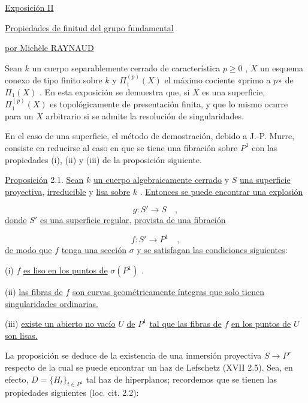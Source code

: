 


\underline{Exposición II}


\underline{\underline{Propiedades de finitud del grupo fundamental}}


\underline{por Michèle RAYNAUD}

Sean  $k$  un cuerpo separablemente cerrado de característica  $p \geqslant 0$ , $X$  un esquema conexo de tipo finito sobre  $k$  y  $\Pi_1^{(p)}(X)$  el máximo cociente «primo a $p$» de  $\Pi_1(X)$ . En esta exposición se demuestra que, si  $X$  es una superficie, $\Pi_1^{(p)}(X)$  es topológicamente de presentación finita, y que lo mismo ocurre para un  $X$  arbitrario si se admite la resolución de singularidades.

En el caso de una superficie, el método de demostración, debido a J.-P. Murre, consiste en reducirse al caso en que se tiene una fibración sobre  $P^1$  con las propiedades (i), (ii) y (iii) de la proposición siguiente.

\underline{Proposición} 2.1.  \underline{Sean}  $k$  \underline{un cuerpo algebraicamente cerrado} y  $S$  \underline{una superficie proyectiva}, \underline{irreducible} y \underline{lisa sobre}  $k$ . \underline{Entonces se puede encontrar una explosión}

\[ g : S' \longrightarrow S \quad , \]
\underline{donde}  $S'$  \underline{es una superficie regular}, \underline{provista de una fibración}

\[ f : S' \longrightarrow P^1 \quad , \]
\underline{de modo que}  $f$  \underline{tenga una sección}  $\sigma$  \underline{y se satisfagan las condiciones siguientes}:

(i)   $f$  \underline{es liso en los puntos de}  $\sigma(P^1)$ .

(ii)  \underline{las fibras de}  $f$  \underline{son curvas geométricamente íntegras que solo tienen singularidades ordinarias.}

(iii) \underline{existe un abierto no vacío}  $U$  \underline{de}  $P^1$  \underline{tal que las fibras de}  $f$  \underline{en los puntos de}  $U$  \underline{son lisas.}

La proposición se deduce de la existencia de una inmersión proyectiva  $S \longrightarrow P^r$  respecto de la cual se puede encontrar un haz de Lefschetz (XVII 2.5). Sea, en efecto,  $D = \{H_t\}_{t \in P^1}$  tal haz de hiperplanos; recordemos que se
tienen las propiedades siguientes (loc. cit. 2.2):

